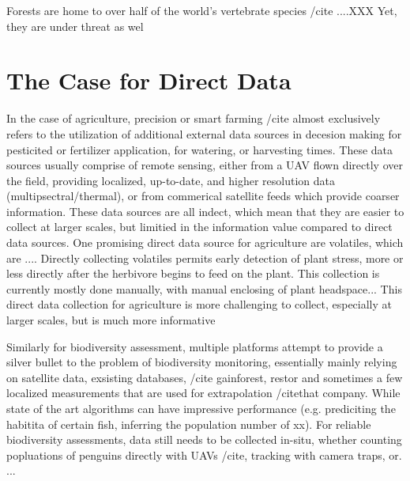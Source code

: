 Forests are home to over half of the world's vertebrate species /cite ....XXX Yet, they are under threat as wel


\section{The Case for Direct Data}
%

In the case of agriculture, precision or smart farming /cite almost exclusively refers to the utilization of additional external data sources in decesion making for pesticited or fertilizer application, for watering, or harvesting times. These data sources usually comprise of remote sensing, either from a UAV flown directly over the field, providing localized, up-to-date, and higher resolution data (multipsectral/thermal), or from commerical satellite feeds which provide coarser information. 
These data sources are all indect, which mean that they are easier to collect at larger scales, but limitied in the information value compared to direct data sources. 
One promising direct data source for agriculture are volatiles, which are ....
Directly collecting volatiles permits early detection of plant stress, more or less directly after the herbivore begins to feed on the plant. This collection is currently mostly done manually, with manual enclosing of plant headspace...  This direct data collection for agriculture is more challenging to collect, especially at larger scales, but is much more informative 

Similarly for biodiversity assessment, multiple platforms attempt to provide a silver bullet to the problem of biodiversity monitoring, essentially mainly relying on satellite data, exsisting databases, /cite {gainforest, restor} and sometimes a few localized measurements that are used for extrapolation /cite{that company}. While state of the art algorithms can have impressive performance (e.g. prediciting the habitita of certain fish, inferring the population number of xx). For reliable biodiversity assessments, data still needs to be collected in-situ, whether counting popluations of penguins directly with UAVs /cite, tracking with camera traps, or. ...

